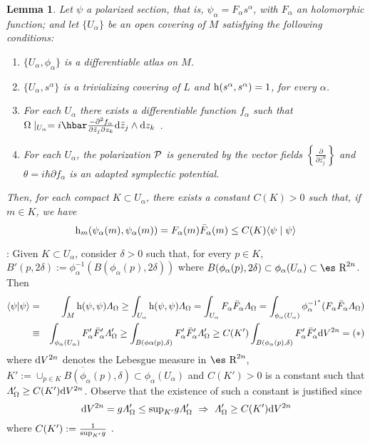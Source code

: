 \documentclass[12pt]{article}
\theoremstyle{plain}
\newtheorem{lem}{Lemma}
\def\beann{\begin{eqnarray*}}
\def\eeann{\end{eqnarray*}}
\def\dst{\(}
\def\derpar#1#2{\frac{\partial{#1}}{\partial{#2}}}
\def\d{{\rm d}}
\def\P{{\cal P}}
\def\h{{\rm h}}
\def\Real{\mbox{\es R}}
\def\LF{{\mit\Lambda}_{\Omega}}
\begin{document}
\begin{lem}
Let $\psi$ a polarized section,
that is, $\psi_\alpha = F_\alpha s^\alpha$,
with $F_\alpha$ an holomorphic function;
and let $\{U_\alpha\}$ be an open covering of $M$
satisfying the following conditions:
\begin{enumerate}
\item
$\{ U_\alpha ,\phi_\alpha \}$ is a differentiable atlas on $M$.
\item
$\{ U_\alpha ,s^\alpha \}$ is a trivializing covering of $L$ and
$\h (s^\alpha ,s^\alpha ) = 1$, for every $\alpha$.
\item
For each $U_\alpha$ there exists a differentiable function
$f_\alpha$ such that
\dst  \Omega \mid _{U_\alpha} =
i \hbar\frac{-\partial^2 f_\alpha}{\partial \bar z_j \partial z_k}
\d \bar z_j \wedge \d z_k\) .
\item
For each $U_\alpha$, the polarization $\P$ is generated by the
vector fields \dst\left\{ \derpar{}{\bar z_j^\alpha}\right\}\)
and $\theta = i\hbar \partial f_\alpha$
is an adapted symplectic potential.
\end{enumerate}
Then, for each compact $K \subset U_\alpha$,
there exists a constant $C(K)>0$ such that,
if $m \in K$, we have
$$
\h_m (\psi_\alpha (m) , \psi_\alpha (m))
= F_\alpha (m) \bar F_\alpha (m)
\leq C(K) \langle \psi \mid \psi \rangle
$$
\end{lem}
:
Given $K \subset U_\alpha$, consider $\delta >0$ such that,
for every $p \in K$,
$B'(p,2\delta ) := \phi_\alpha^{-1}(B(\phi_\alpha (p),2\delta ))$
where
$B(\phi_\alpha (p),2\delta ) \subset \phi_\alpha(U_\alpha )
\subset \Real^{2n}$.
Then
\beann
\langle \psi | \psi \rangle &=&
\int_M \h (\psi ,\psi ) \LF
\geq
\int_{U_\alpha} \h (\psi ,\psi ) \LF =
\int_{U_\alpha} F_\alpha \bar F_\alpha \LF =
\int_{\phi_\alpha (U_\alpha )}\phi_\alpha^{{-1}^*}(F_\alpha \bar
F_\alpha \LF)
\\ &\equiv&
\int_{\phi_\alpha (U_\alpha )}F'_\alpha \bar F'_\alpha \LF '
\geq
\int_{B(\phi\alpha (p),\delta )}F'_\alpha \bar F'_\alpha \LF '
\geq
C(K') \int_{B(\phi_\alpha (p),\delta )}F'_\alpha \bar F'_\alpha \d
V^{2n}
= (*)
\eeann
where $\d V^{2n}$ denotes the Lebesgue measure in $\Real^{2n}$,
 $K':=\overline{\cup_{p\in K}B(\phi_\alpha (p),\delta)}
 \subset\phi_\alpha(U_\alpha)$
and $C(K') > 0$ is a constant such that $\LF ' \geq C(K') \d V^{2n}$.
Observe that the existence of such a constant is justified since
$$
\d V^{2n} = g \LF ' \leq {\rm sup}_{K'} g \LF '
\ \Rightarrow \
\LF ' \geq C(K') \d V^{2n}
$$
where \dst C(K') :=  \frac{1}{{\rm sup}_{K'}g}\) .
\end{document}
